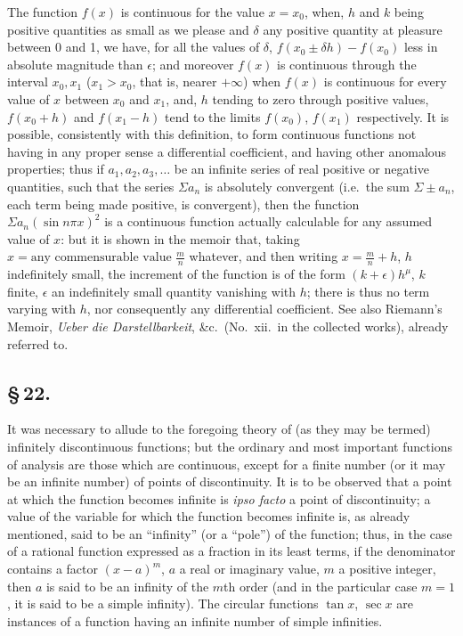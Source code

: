 \documentclass[11pt,a4paper]{article}
\begin{document}
The function $f(x)$ is continuous for the value $x = x_{0}$, when, $h$ and $k$ being positive quantities as small as we please and $\delta$ any positive quantity at pleasure between 0 and 1, we have, for all the values of $\delta$, $f(x_{0} \pm \delta h) - f(x_{0})$ less in absolute magnitude than $\epsilon$; and moreover $f(x)$ is continuous through the interval $x_{0}, x_{1}$ ($x_{1} > x_{0}$, that is, nearer $+\infty$) when $f(x)$ is continuous for every value of $x$ between $x_{0}$ and $x_{1}$, and, $h$ tending to zero through positive values, $f(x_{0} + h)$ and $f(x_{1} - h)$ tend to the limits $f(x_{0})$, $f(x_{1})$ respectively. It is possible, consistently with this definition, to form continuous functions not having in any proper sense a differential coefficient, and having other anomalous properties; thus if $a_{1}, a_{2}, a_{3}, \ldots$ be an infinite series of real positive or negative quantities, such that the series $\Sigma a_{n}$ is absolutely convergent (i.e.\ the sum $\Sigma \pm a_{n}$, each term being made positive, is convergent), then the function $\Sigma a_{n}(\sin n\pi x)^{2}$ is a continuous function actually calculable for any assumed value of $x$: but it is shown in the memoir that, taking $x = \text{any commensurable value } \frac{m}{n}$ whatever, and then writing $x = \frac{m}{n} + h$, $h$ indefinitely small, the increment of the function is of the form $(k + \epsilon)h^{\mu}$, $k$ finite, $\epsilon$ an indefinitely small quantity vanishing with $h$; there is thus no term varying with $h$, nor consequently any differential coefficient. See also Riemann's Memoir, \textit{Ueber die Darstellbarkeit}, \&c.\ (No.~xii.\ in the collected works), already referred to.

\subsection*{\S\,22.}

It was necessary to allude to the foregoing theory of (as they may be termed) infinitely discontinuous functions; but the ordinary and most important functions of analysis are those which are continuous, except for a finite number (or it may be an infinite number) of points of discontinuity. It is to be observed that a point at which the function becomes infinite is \textit{ipso facto} a point of discontinuity; a value of the variable for which the function becomes infinite is, as already mentioned, said to be an ``infinity'' (or a ``pole'') of the function; thus, in the case of a rational function expressed as a fraction in its least terms, if the denominator contains a factor $(x - a)^{m}$, $a$ a real or imaginary value, $m$ a positive integer, then $a$ is said to be an infinity of the $m$th order (and in the particular case $m = 1$, it is said to be a simple infinity). The circular functions $\tan x$, $\sec x$ are instances of a function having an infinite number of simple infinities.
\end{document}
